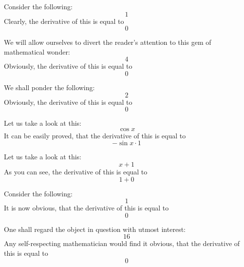 \documentclass{article}
\begin{document}
Consider the following:
\begin{equation}
1 
\end{equation}
Clearly, the derivative of this is equal to
\begin{equation}
0 
\end{equation}

We will allow ourselves to divert the reader's attention to this gem of mathematical wonder:
\begin{equation}
4 
\end{equation}
Obviously, the derivative of this is equal to
\begin{equation}
0 
\end{equation}

We shall ponder the following:
\begin{equation}
2 
\end{equation}
Obviously, the derivative of this is equal to
\begin{equation}
0 
\end{equation}

Let us take a look at this:
\begin{equation}
\cos x 
\end{equation}
It can be easily proved, that the derivative of this is equal to
\begin{equation}
-\sin x \cdot 1 
\end{equation}

Let us take a look at this:
\begin{equation}
x + 1 
\end{equation}
As you can see, the derivative of this is equal to
\begin{equation}
1 + 0 
\end{equation}

Consider the following:
\begin{equation}
1 
\end{equation}
It is now obvious, that the derivative of this is equal to
\begin{equation}
0 
\end{equation}

One shall regard the object in question with utmost interest:
\begin{equation}
16 
\end{equation}
Any self-respecting mathematician would find it obvious, that the derivative of this is equal to
\begin{equation}
0 
\end{equation}
\end{document}
